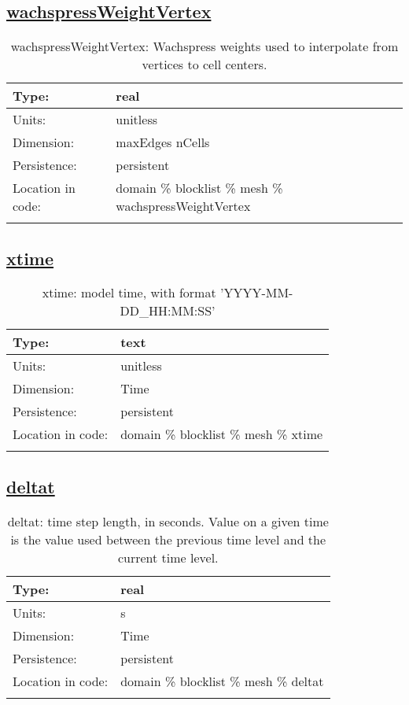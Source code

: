 \subsection[wachspressWeightVertex]{\hyperref[sec:var_tab_mesh]{wachspressWeightVertex}}
\label{subsec:var_sec_mesh_wachspressWeightVertex}
\begin{center}
\begin{longtable}{| p{2.0in} | p{4.0in} |}
        \hline 
        Type: & real \\
        \hline 
        Units: & \si{unitless} \\
        \hline 
        Dimension: & maxEdges nCells \\
        \hline 
        Persistence: & persistent \\
        \hline 
         Location in code: & domain \% blocklist \% mesh \% wachspressWeightVertex \\
         \hline 
    \caption{wachspressWeightVertex: Wachspress weights used to interpolate from vertices to cell centers.}
\end{longtable}
\end{center}
\subsection[xtime]{\hyperref[sec:var_tab_mesh]{xtime}}
\label{subsec:var_sec_mesh_xtime}
\begin{center}
\begin{longtable}{| p{2.0in} | p{4.0in} |}
        \hline 
        Type: & text \\
        \hline 
        Units: & \si{unitless} \\
        \hline 
        Dimension: & Time \\
        \hline 
        Persistence: & persistent \\
        \hline 
         Location in code: & domain \% blocklist \% mesh \% xtime \\
         \hline 
    \caption{xtime: model time, with format 'YYYY-MM-DD\_HH:MM:SS'}
\end{longtable}
\end{center}
\subsection[deltat]{\hyperref[sec:var_tab_mesh]{deltat}}
\label{subsec:var_sec_mesh_deltat}
\begin{center}
\begin{longtable}{| p{2.0in} | p{4.0in} |}
        \hline 
        Type: & real \\
        \hline 
        Units: & \si{s} \\
        \hline 
        Dimension: & Time \\
        \hline 
        Persistence: & persistent \\
        \hline 
         Location in code: & domain \% blocklist \% mesh \% deltat \\
         \hline 
    \caption{deltat: time step length, in seconds.  Value on a given time is the value used between the previous time level and the current time level.}
\end{longtable}
\end{center}
